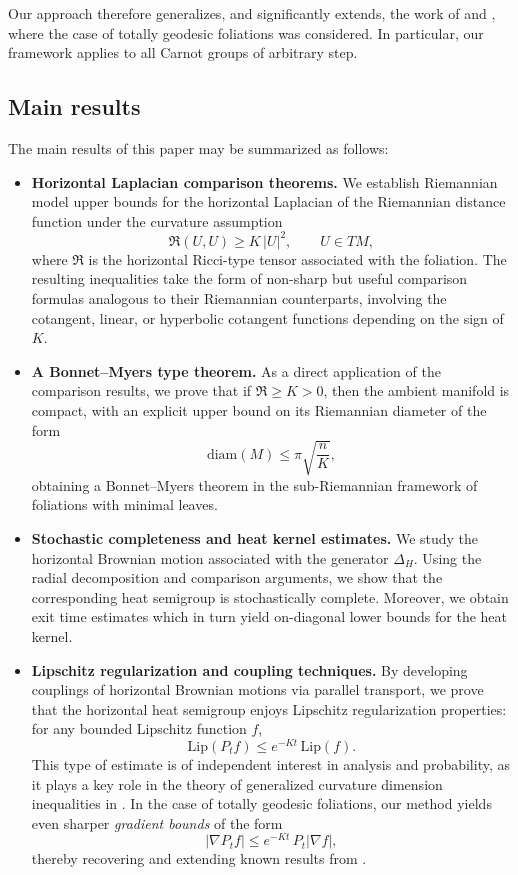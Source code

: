 \documentclass[11pt]{article}
\numberwithin{equation}{section}
\begin{document}
Our approach therefore generalizes, and significantly extends, the work of
\cite{radial} and \cite{BauGr}, where the case of totally geodesic foliations was considered. In particular,
our framework applies to all Carnot groups of arbitrary step.

\subsection*{Main results}

The main results of this paper may be summarized as follows:

\begin{itemize}
    \item \textbf{Horizontal Laplacian comparison theorems.}
    We establish Riemannian model upper bounds for the horizontal Laplacian of the
    Riemannian distance function under the curvature assumption
    \[
        \mathfrak R(U,U) \geq K \, |U|^2, \qquad U \in TM,
    \]
    where $\mathfrak R$ is the horizontal Ricci-type tensor associated with the foliation. The
    resulting inequalities take the form of  non-sharp but useful comparison formulas analogous
    to their Riemannian counterparts, involving the cotangent, linear, or
    hyperbolic cotangent functions depending on the sign of $K$.

    \item \textbf{A Bonnet--Myers type theorem.}
    As a direct application of the comparison results, we prove that if
    $\mathfrak R \geq K > 0$, then the ambient manifold is compact, with an explicit
    upper bound on its Riemannian diameter of the form
    \[
        \mathrm{diam}(M) \leq \pi \sqrt{\frac{n}{K}},
    \]
   obtaining a Bonnet--Myers theorem in the sub-Riemannian
    framework of foliations with minimal leaves.

    \item \textbf{Stochastic completeness and heat kernel estimates.}
    We study the horizontal Brownian motion associated with the generator
    $\Delta_H$. Using the radial decomposition and comparison arguments, we
    show that the corresponding heat semigroup is stochastically complete.
    Moreover, we obtain  exit time estimates which in turn yield
    on-diagonal lower bounds for the heat kernel.

    \item \textbf{Lipschitz regularization and coupling techniques.}
    By developing couplings of horizontal Brownian motions via parallel
    transport, we prove that the horizontal heat semigroup enjoys Lipschitz
    regularization properties: for any bounded Lipschitz function $f$,
    \[
        \mathrm{Lip}(P_t f) \leq e^{-Kt} \, \mathrm{Lip}(f).
    \]
    This type of estimate is of independent interest in analysis and
    probability, as it plays a key role in the theory of generalized curvature
    dimension inequalities in \cite{BG170}. In the case of totally geodesic foliations, our
    method yields even sharper \emph{gradient bounds} of the form
    \[
        |\nabla P_t f| \leq e^{-Kt} \, P_t |\nabla f|,
    \]
    thereby recovering and extending known results from \cite{MR3601645}.


\end{itemize}
\end{document}
